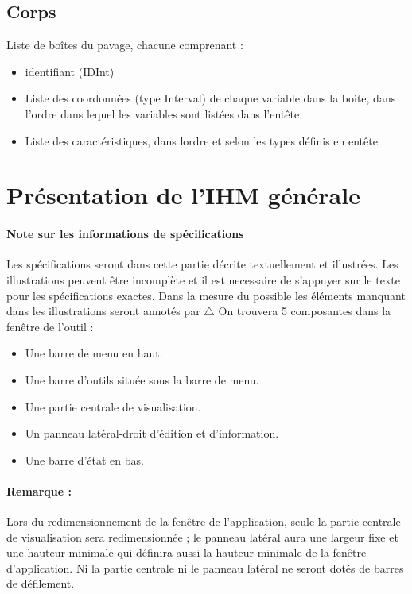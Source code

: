 \documentclass[a4paper]{article}
\begin{document}
\subsection{Corps}
Liste de boîtes du pavage, chacune comprenant :
\begin{itemize}
\item identifiant (IDInt)
\item Liste des coordonnées (type Interval) de chaque variable dans la boite, dans l'ordre dans lequel les variables sont listées dans l'entête.
\item Liste des caractéristiques, dans lordre et selon les types définis en entête
\end{itemize}

\section{Présentation de l'IHM générale}
\paragraph{Note sur les informations de spécifications}
Les spécifications seront dans cette partie décrite textuellement et illustrées. Les illustrations peuvent être incomplète et il est necessaire de s'appuyer sur le texte pour les spécifications exactes. Dans la mesure du possible les éléments manquant dans les illustrations seront annotés par $\triangle$ 
On trouvera 5 composantes dans la fenêtre de l'outil :
\begin{itemize}
\item Une barre de menu en haut.
\item Une barre d'outils située sous la barre de menu.
\item Une partie centrale de visualisation.
\item Un panneau latéral-droit d'édition et d'information.
\item Une barre d'état en bas.
\end{itemize}

\paragraph{Remarque :} Lors du redimensionnement de la fenêtre de l'application, seule la partie centrale de visualisation sera redimensionnée ; le panneau latéral aura une largeur fixe et une hauteur minimale qui définira aussi la hauteur minimale de la fenêtre d'application. Ni la partie centrale ni le panneau latéral ne seront dotés de barres de défilement.
\end{document}
